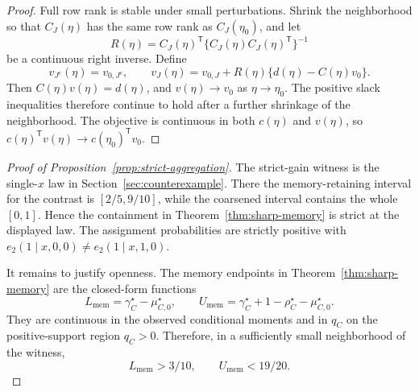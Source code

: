 \documentclass[11pt]{article}
\newcommand{\transpose}{\mathsf{T}}
\theoremstyle{definition}
\theoremstyle{plain}
\theoremstyle{remark}
\begin{document}
\begin{proof}
Full row rank is stable under small perturbations.  Shrink the neighborhood so that \(C_J(\eta)\) has the same row rank as \(C_J(\eta_0)\), and let
\[
R(\eta)=C_J(\eta)^\transpose\{C_J(\eta)C_J(\eta)^\transpose\}^{-1}
\]
be a continuous right inverse.  Define
\[
v_{J^c}(\eta)=v_{0,J^c},\qquad
v_J(\eta)=v_{0,J}+R(\eta)\{d(\eta)-C(\eta)v_0\}.
\]
Then \(C(\eta)v(\eta)=d(\eta)\), and \(v(\eta)\to v_0\) as \(\eta\to\eta_0\).  The positive slack inequalities therefore continue to hold after a further shrinkage of the neighborhood.  The objective is continuous in both \(c(\eta)\) and \(v(\eta)\), so \(c(\eta)^\transpose v(\eta)\to c(\eta_0)^\transpose v_0\).
\end{proof}

\begin{proof}[Proof of Proposition~\ref{prop:strict-aggregation}]
The strict-gain witness is the single-\(x\) law in Section~\ref{sec:counterexample}.  There the memory-retaining interval for the contrast is \([2/5,9/10]\), while the coarsened interval contains the whole \([0,1]\).  Hence the containment in Theorem~\ref{thm:sharp-memory} is strict at the displayed law.  The assignment probabilities are strictly positive with \(e_2(1\mid x,0,0)\ne e_2(1\mid x,1,0)\).

It remains to justify openness.  The memory endpoints in Theorem~\ref{thm:sharp-memory} are the closed-form functions
\[
L_{\mathrm{mem}}=\gamma_C^{\star}-\mu_{C,0}^{\star},
\qquad
U_{\mathrm{mem}}=\gamma_C^{\star}+1-\rho_C^{\star}-\mu_{C,0}^{\star}.
\]
They are continuous in the observed conditional moments and in \(q_C\) on the positive-support region \(q_C>0\).  Therefore, in a sufficiently small neighborhood of the witness,
\[
L_{\mathrm{mem}}>3/10,\qquad U_{\mathrm{mem}}<19/20.
\]


\end{proof}
\end{document}
